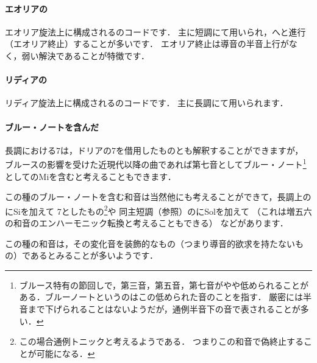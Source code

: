 \documentclass[dvipdfmx,uplatex,b5paper,openany,jbase=12Q,nomag*,textwidth-limit=44%
               ]{gachimuchi}
\begin{document}
\paragraph{エオリアの\Gnv\Min{}}
エオリア旋法上に構成される\Gnv\Min{}のコードです．
主に短調にて用いられ，\Gni\Min へと進行（エオリア終止）することが多いです．
エオリア終止は導音の半音上行がなく，弱い解決であることが特徴です．

\paragraph{リディアの\Gnii{}}
リディア旋法上に構成される\Gnii{}のコードです．
主に長調にて用いられます．

\paragraph{ブルー・ノートを含んだ\Gniv{}}
長調における\Gniv\subsc7は，ドリアの\Gniv\subsc7を借用したものとも解釈することができますが，
ブルースの影響を受けた近現代以降の曲であれば第七音としてブルー・ノート\footnote{%
  ブルース特有の節回しで，第三音，第五音，第七音がやや低められることがある．ブルーノートというのはこの低められた音のことを指す．
  厳密には半音まで下げられることはないようだが，通例半音下の音で表されることが多い．
}としてのMi\aFlat を含むと考えることもできます．

この種のブルー・ノートを含む和音は当然他にも考えることができて，長調上の\Gni にSi\aFlat を加えて
\Gni\subsc7としたもの\footnote{この場合通例トニックと考えるようである．
  つまりこの和音で偽終止することが可能になる．
}や
同主短調（参照）の\bFlat\Gnvi にSol\aFlat を加えて
\bFlat\Gnvi{}（これは増五六の和音のエンハーモニック転換と考えることもできる）
などがあります．

\begin{Music}[0.6\linewidth]
  \nostartrule%
  \Startpiece%
  \Notes%
  \en%
  \changecontext%
  \Notes
  \en
  \endpiece
\end{Music}

この種の和音は，その変化音を装飾的なもの（つまり導音的欲求を持たないもの）であるとみることが多いようです．
\end{document}
